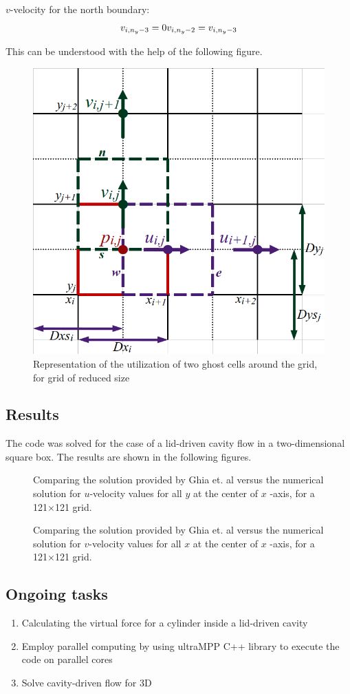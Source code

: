 \documentclass[12pt,a4paper,fleqn]{article}
\begin{document}
\(v\)-velocity for the north boundary:
\begin{equation}
v_{i,n_y-3} = 0\\
v_{i,n_y-2} = v_{i,n_y-3}
\end{equation}

This can be understood with the help of the following figure.

\begin{figure}[H]
    \centering
    \includegraphics[width=0.9\linewidth]{grid_staggered.png}
    \caption{Representation of the utilization of two ghost cells around the grid, for grid of reduced size}
\end{figure}

\subsection{Results}
The code was solved for the case of a lid-driven cavity flow in a two-dimensional square box. The results are shown in the following figures.

\begin{figure}[H]
    \centering
    \caption{Comparing the solution provided by Ghia et. al versus the numerical solution for \(u\)-velocity values for all \(y\) at the center of \(x\) -axis, for a 121\(\times\)121 grid.}
\end{figure}

\begin{figure}[H]
    \centering
    \caption{Comparing the solution provided by Ghia et. al versus the numerical solution for \(v\)-velocity values for all \(x\) at the center of \(x\) -axis, for a 121\(\times\)121 grid.}
\end{figure}

\subsection{Ongoing tasks}
\begin{enumerate}
    \item Calculating the virtual force for a cylinder inside a lid-driven cavity
    \item Employ parallel computing by using ultraMPP C++ library to execute the code on parallel cores
    \item Solve cavity-driven flow for 3D
\end{enumerate}
\end{document}
